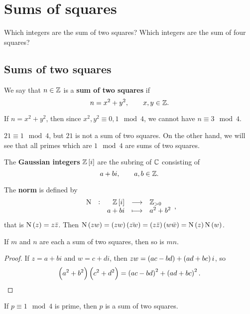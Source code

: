 \section{Sums of squares}

Which integers are the sum of two squares? Which integers are the sum of four squares?

\subsection{Sums of two squares}

\begin{definition}
We say that $ n \in \mathbb{Z} $ is a \textbf{sum of two squares} if
$$ n = x^2 + y^2, \qquad x, y \in \mathbb{Z}. $$
\end{definition}

\begin{example*}
If $ n = x^2 + y^2 $, then since $ x^2, y^2 \equiv 0, 1 \mod 4 $, we cannot have $ n \equiv 3 \mod 4 $.
\end{example*}

\begin{example*}
$ 21 \equiv 1 \mod 4 $, but $ 21 $ is not a sum of two squares. On the other hand, we will see that all primes which are $ 1 \mod 4 $ are sums of two squares.
\end{example*}

\begin{definition}
The \textbf{Gaussian integers} $ \ZZ\sbr{i} $ are the subring of $ \mathbb{C} $ consisting of
$$ a + bi, \qquad a, b \in \mathbb{Z}. $$
\end{definition}

The \textbf{norm} is defined by
$$ \function[\N]{\ZZ\sbr{i}}{\ZZ_{> 0}}{a + bi}{a^2 + b^2}, $$
that is $ \N\br{z} = z\bar{z} $. Then $ \N\br{zw} = \br{zw}\br{\bar{zw}} = \br{z\bar{z}}\br{w\bar{w}} = \N\br{z}\N\br{w} $.

\begin{lemma}
\label{lem:46}
If $ m $ and $ n $ are each a sum of two squares, then so is $ mn $.
\end{lemma}

\begin{proof}
If $ z = a + bi $ and $ w = c + di $, then $ zw = \br{ac - bd} + \br{ad + bc}i $, so
$$ \br{a^2 + b^2}\br{c^2 + d^2} = \br{ac - bd}^2 + \br{ad + bc}^2. $$
\end{proof}

\begin{theorem}
\label{thm:47}
If $ p \equiv 1 \mod 4 $ is prime, then $ p $ is a sum of two squares.
\end{theorem}

